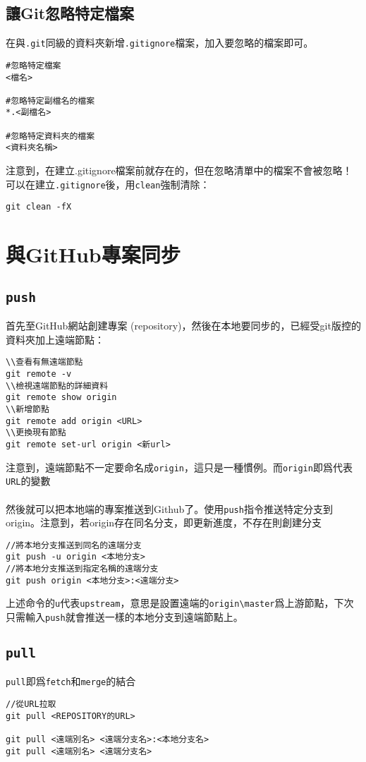 \documentclass{article}
\newcommand{\code}[1]{\texttt{#1}}
\begin{document}
\subsection{讓Git忽略特定檔案}
在與\code{.git}同級的資料夾新增\code{.gitignore}檔案，加入要忽略的檔案即可。
\begin{lstlisting}[language=git]
#忽略特定檔案
<檔名>

#忽略特定副檔名的檔案
*.<副檔名>

#忽略特定資料夾的檔案
<資料夾名稱>
\end{lstlisting}
注意到，在建立.gitignore檔案前就存在的，但在忽略清單中的檔案不會被忽略！可以在建立\code{.gitignore}後，用\code{clean}強制清除：
\begin{lstlisting}[language=git]
git clean -fX
\end{lstlisting}

\section{與GitHub專案同步}
\subsection{\texttt{push}}
首先至GitHub網站創建專案 (repository)，然後在本地要同步的，已經受git版控的資料夾加上遠端節點：
\begin{lstlisting}[language=git]
\\查看有無遠端節點
git remote -v
\\檢視遠端節點的詳細資料
git remote show origin
\\新增節點
git remote add origin <URL>
\\更換現有節點
git remote set-url origin <新url>
\end{lstlisting}
注意到，遠端節點不一定要命名成\texttt{origin}，這只是一種慣例。而\texttt{origin}即爲代表\texttt{URL}的變數
\\\\
然後就可以把本地端的專案推送到Github了。使用\texttt{push}指令推送特定分支到origin。注意到，若origin存在同名分支，即更新進度，不存在則創建分支
\begin{lstlisting}[language=git]
//將本地分支推送到同名的遠端分支
git push -u origin <本地分支>
//將本地分支推送到指定名稱的遠端分支
git push origin <本地分支>:<遠端分支>
\end{lstlisting}
上述命令的\texttt{u}代表\texttt{upstream}，意思是設置遠端的\texttt{origin\textbackslash master}爲上游節點，下次只需輸入\texttt{push}就會推送一樣的本地分支到遠端節點上。
\subsection{\texttt{pull}}
\texttt{pull}即爲\texttt{fetch}和\texttt{merge}的結合
\begin{lstlisting}[language=git]
//從URL拉取
git pull <REPOSITORY的URL> 

git pull <遠端別名> <遠端分支名>:<本地分支名>
git pull <遠端別名> <遠端分支名>
\end{lstlisting}
\end{document}
